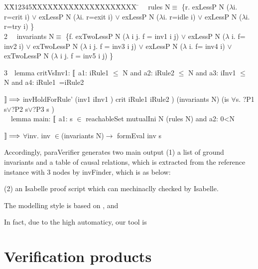 \documentclass{llncs}
\newlength{\fminilength}
\newenvironment{fmini}[1][\linewidth]
  {\setlength{\fminilength}{#1\fboxsep-2\fboxrule}%
   \vspace{2ex}\noindent\begin{lrbox}{\fminibox}\begin{minipage}{\fminilength}%
   \mbox{ }\hfill\vspace{-2.5ex}}%
  {\end{minipage}\end{lrbox}\vspace{1ex}\hspace{0ex}%
   \framebox{\usebox{\fminibox}}}
\newenvironment{specification}
{\noindent\scriptsize
\tt\begin{fmini}\begin{tabbing}X\=X12345\=XXXX\=XXXX\=XXXX\=XXXX\=XXXX
\=\+\kill} {\end{tabbing}\normalfont\end{fmini}}
\def \twoSpaces {\ \ }
\begin{document}
\begin{specification}
1\twoSpaces  
rules N$\equiv$ \{r. exLessP N ($\lambda$i.  r=crit i)  $\vee$
exLessP N ($\lambda$i.  r=exit i)  $\vee$
exLessP N ($\lambda$i.  r=idle i)  $\vee$
exLessP N ($\lambda$i.  r=try i)  \}\\




2\twoSpaces 
invariants N$\equiv$ \{f. exTwoLessP N ($\lambda$ i j.  f = inv1 i j)  $\vee$
exLessP N ($\lambda$ i.  f= inv2 i)  $\vee$
exTwoLessP N ($\lambda$ i j.  f = inv3 i j)  $\vee$
exLessP N ($\lambda$ i.  f= inv4 i)  $\vee$
exTwoLessP N ($\lambda$ i j.  f = inv5 i j)   \}



3\twoSpaces lemma critVsInv1: 
    $\emph{$\mathopen{\lbrack\mkern-3mu\lbrack}$}$   a1:
iRule1 $\le$ N
  and  a2:
iRule2 $\le$ N
  and
a3:
iInv1
$\le$ N
  and  a4:
iRule1~=iRule2


    $\emph{$\mathclose{\rbrack\mkern-3mu\rbrack}$}\Longrightarrow$
invHoldForRule' (inv1  iInv1 ) crit iRule1
iRule2 ) (invariants   N)
  (is
$\forall$s. ?P1 s$\vee$?P2 s$\vee$?P3 s
)\\

\twoSpaces lemma main:
   $\emph{$\mathopen{\lbrack\mkern-3mu\lbrack}$}$   a1:
s $\in$ reachableSet { mutualIni  N} (rules N)
   and
a2:
0<N

   $\emph{$\mathclose{\rbrack\mkern-3mu\rbrack}$}\Longrightarrow$
$\forall$inv. inv $\in$(invariants N)$\longrightarrow$
formEval
inv s\\

\end{specification} 
Accordingly, {\sf paraVerifier} generates two main output (1) a list of ground invariants and a table of causal relations, which is extracted
 from the reference instance with 3 nodes by {\sf invFinder}, which is as below:
 
 
  (2) an Isabelle proof script which can mechinaclly checked by Isabelle.

 The modelling style is based on , and 

In fact, due to the high automaticy, our tool is





\section{Verification products}
\end{document}

